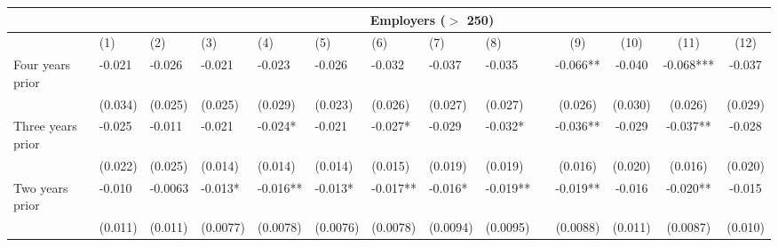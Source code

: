 \begin{tabular}{lccccrrrrrcccc}
\toprule
      & \multicolumn{13}{c}{Employers ($>$ 250)} \\
\midrule
      & \multicolumn{1}{l}{(1)} & \multicolumn{1}{l}{(2)} & \multicolumn{1}{l}{(3)} & \multicolumn{1}{l}{(4)} & \multicolumn{1}{l}{(5)} & \multicolumn{1}{l}{(6)} & \multicolumn{1}{l}{(7)} & \multicolumn{1}{l}{(8)} &       & (9)   & (10)  & (11)  & (12) \\
\midrule
\midrule
Four years prior & \multicolumn{1}{l}{-0.021} & \multicolumn{1}{l}{-0.026} & \multicolumn{1}{l}{-0.021} & \multicolumn{1}{l}{-0.023} & \multicolumn{1}{l}{-0.026} & \multicolumn{1}{l}{-0.032} & \multicolumn{1}{l}{-0.037} & \multicolumn{1}{l}{-0.035} &       & -0.066** & -0.040 & -0.068*** & -0.037 \\
      & \multicolumn{1}{l}{(0.034)} & \multicolumn{1}{l}{(0.025)} & \multicolumn{1}{l}{(0.025)} & \multicolumn{1}{l}{(0.029)} & \multicolumn{1}{l}{(0.023)} & \multicolumn{1}{l}{(0.026)} & \multicolumn{1}{l}{(0.027)} & \multicolumn{1}{l}{(0.027)} &       & (0.026) & (0.030) & (0.026) & (0.029) \\
Three years prior & \multicolumn{1}{l}{-0.025} & \multicolumn{1}{l}{-0.011} & \multicolumn{1}{l}{-0.021} & \multicolumn{1}{l}{-0.024*} & \multicolumn{1}{l}{-0.021} & \multicolumn{1}{l}{-0.027*} & \multicolumn{1}{l}{-0.029} & \multicolumn{1}{l}{-0.032*} &       & -0.036** & -0.029 & -0.037** & -0.028 \\
      & \multicolumn{1}{l}{(0.022)} & \multicolumn{1}{l}{(0.025)} & \multicolumn{1}{l}{(0.014)} & \multicolumn{1}{l}{(0.014)} & \multicolumn{1}{l}{(0.014)} & \multicolumn{1}{l}{(0.015)} & \multicolumn{1}{l}{(0.019)} & \multicolumn{1}{l}{(0.019)} &       & (0.016) & (0.020) & (0.016) & (0.020) \\
Two years prior & \multicolumn{1}{l}{-0.010} & \multicolumn{1}{l}{-0.0063} & \multicolumn{1}{l}{-0.013*} & \multicolumn{1}{l}{-0.016**} & \multicolumn{1}{l}{-0.013*} & \multicolumn{1}{l}{-0.017**} & \multicolumn{1}{l}{-0.016*} & \multicolumn{1}{l}{-0.019**} &       & -0.019** & -0.016 & -0.020** & -0.015 \\
      & \multicolumn{1}{l}{(0.011)} & \multicolumn{1}{l}{(0.011)} & \multicolumn{1}{l}{(0.0077)} & \multicolumn{1}{l}{(0.0078)} & \multicolumn{1}{l}{(0.0076)} & \multicolumn{1}{l}{(0.0078)} & \multicolumn{1}{l}{(0.0094)} & \multicolumn{1}{l}{(0.0095)} &       & (0.0088) & (0.011) & (0.0087) & (0.010) \\

\end{tabular}
